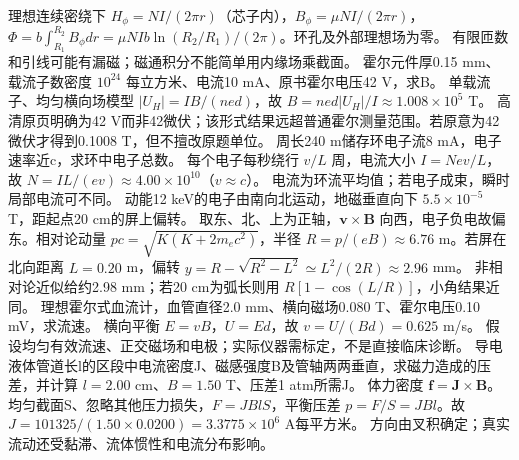 \workings 理想连续密绕下 $H_\phi=NI/(2\pi r)$（芯子内），$B_\phi=\mu NI/(2\pi r)$，$\Phi=b\int_{R_1}^{R_2}B_\phi dr=\mu NIb\ln(R_2/R_1)/(2\pi)$。环孔及外部理想场为零。
\crosscheck 有限匝数和引线可能有漏磁；磁通积分不能简单用内缘场乘截面。
\problemtext 霍尔元件厚0.15 mm、载流子数密度 $10^{24}$ 每立方米、电流10 mA、原书霍尔电压42 V，求B。
\workings 单载流子、均匀横向场模型 $|U_H|=IB/(ne d)$，故 $B=ne d|U_H|/I\approx1.008\times10^5$ T。
\crosscheck 高清原页明确为42 V而非42微伏；该形式结果远超普通霍尔测量范围。若原意为42微伏才得到0.1008 T，但不擅改原题单位。
\problemtext 周长240 m储存环电子流8 mA，电子速率近c，求环中电子总数。
\workings 每个电子每秒绕行 $v/L$ 周，电流大小 $I=Ne v/L$，故 $N=IL/(ev)\approx4.00\times10^{10}$（$v\approx c$）。
\crosscheck 电流为环流平均值；若电子成束，瞬时局部电流可不同。
\problemtext 动能12 keV的电子由南向北运动，地磁垂直向下 $5.5\times10^{-5}$ T，距起点20 cm的屏上偏转。
\workings 取东、北、上为正轴，$\bm v\times\bm B$ 向西，电子负电故偏东。相对论动量 $pc=\sqrt{K(K+2m_ec^2)}$，半径 $R=p/(eB)\approx6.76$ m。若屏在北向距离 $L=0.20$ m，偏转 $y=R-\sqrt{R^2-L^2}\simeq L^2/(2R)\approx2.96$ mm。
\crosscheck 非相对论近似给约2.98 mm；若20 cm为弧长则用 $R[1-\cos(L/R)]$，小角结果近同。
\problemtext 理想霍尔式血流计，血管直径2.0 mm、横向磁场0.080 T、霍尔电压0.10 mV，求流速。
\workings 横向平衡 $E=vB$，$U=Ed$，故 $v=U/(Bd)=0.625$ m/s。
\crosscheck 假设均匀有效流速、正交磁场和电极；实际仪器需标定，不是直接临床诊断。
\problemtext 导电液体管道长l的区段中电流密度J、磁感强度B及管轴两两垂直，求磁力造成的压差，并计算 $l=2.00$ cm、$B=1.50$ T、压差1 atm所需J。
\workings 体力密度 $\bm f=\bm J\times\bm B$。均匀截面S、忽略其他压力损失，$F=JBlS$，平衡压差 $p=F/S=JBl$。故 $J=101325/(1.50\times0.0200)=3.3775\times10^6$ A每平方米。
\crosscheck 方向由叉积确定；真实流动还受黏滞、流体惯性和电流分布影响。
